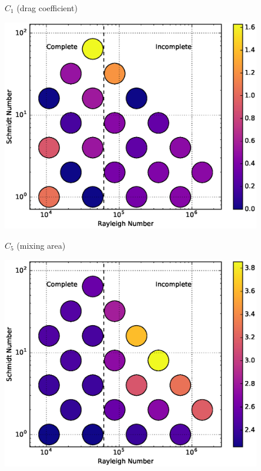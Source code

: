 \documentclass[12pt]{beamer}
\begin{document}
\begin{frame}[t]{$C_1$ (drag coefficient)}
\begin{center}
\vspace{-11pt}
\includegraphics[width=0.85\textwidth]{graphics/C1-vs-Rayleigh-Schmidt.eps}
\end{center}
\end{frame}

\begin{frame}[t]{$C_5$ (mixing area)}
\begin{center}
\vspace{-11pt}
\includegraphics[width=0.85\textwidth]{graphics/C5-vs-Rayleigh-Schmidt.eps}
\end{center}
\end{frame}

\end{document}
